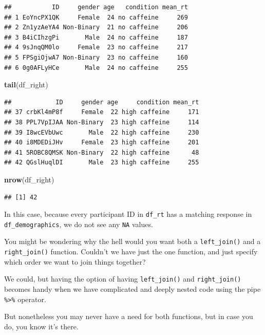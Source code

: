 \documentclass[
]{book}
\newenvironment{Shaded}{\begin{snugshade}}{\end{snugshade}}
\newcommand{\FunctionTok}[1]{\textcolor[rgb]{0.13,0.29,0.53}{\textbf{#1}}}
\newcommand{\NormalTok}[1]{#1}
\begin{document}
\begin{verbatim}
##           ID     gender age   condition mean_rt
## 1 EoYncPX1QK     Female  24 no caffeine     269
## 2 Zn1yzAeYA4 Non-Binary  21 no caffeine     206
## 3 B4iCIhzgPi       Male  24 no caffeine     187
## 4 9sJnqQM0lo     Female  23 no caffeine     217
## 5 FPSgiOjwA7 Non-Binary  23 no caffeine     160
## 6 0g0AFLyHCe       Male  24 no caffeine     255
\end{verbatim}

\begin{Shaded}
\begin{Highlighting}[]
\FunctionTok{tail}\NormalTok{(df\_right)}
\end{Highlighting}
\end{Shaded}

\begin{verbatim}
##            ID     gender age     condition mean_rt
## 37 crbKl4mP8f     Female  22 high caffeine     171
## 38 PPL7VpIJAA Non-Binary  23 high caffeine     114
## 39 I8wcEVbUwc       Male  22 high caffeine     230
## 40 i8MDEDiJHv     Female  23 high caffeine     201
## 41 5ROBC8QMSK Non-Binary  22 high caffeine      48
## 42 QGslHuqlDI       Male  23 high caffeine     255
\end{verbatim}

\begin{Shaded}
\begin{Highlighting}[]
\FunctionTok{nrow}\NormalTok{(df\_right)}
\end{Highlighting}
\end{Shaded}

\begin{verbatim}
## [1] 42
\end{verbatim}

In this case, because every participant ID in \texttt{df\_rt} has a matching response in \texttt{df\_demographics}, we do not see any \texttt{NA} values.

You might be wondering why the hell would you want both a \texttt{left\_join()} and a \texttt{right\_join()} function. Couldn't we have just the one function, and just specify which order we want to join things together?

We could, but having the option of having \texttt{left\_join()} and \texttt{right\_join()} becomes handy when we have complicated and deeply nested code using the pipe \texttt{\%\textgreater{}\%} operator.

But nonetheless you may never have a need for both functions, but in case you do, you know it's there.
\end{document}
